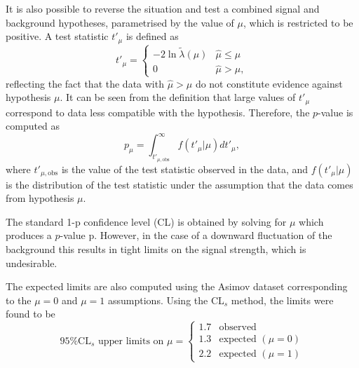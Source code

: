 It is also possible to reverse the situation and test a combined signal
and background hypotheses, parametrised by the value of $\mu$, which is
restricted to be positive. A test statistic $t'_\mu$ is defined as
\begin{equation}
t'_\mu =
    \begin{cases}
     -2\ln{\tilde\lambda(\mu)} & \hat\mu \leq \mu \\
     0                         & \hat\mu > \mu,
    \end{cases}
\end{equation}
reflecting the fact that the data with $\hat\mu > \mu$ do not constitute
evidence against hypothesis $\mu$. It can be seen from the definition
that large values of $t'_\mu$ correspond to data less compatible with the
hypothesis. Therefore, the $p$-value is computed as
\begin{equation}
p_\mu = \int_{t'_{\mu, \text{obs}}}^{\infty} f(t'_\mu | \mu) d t'_\mu,
\end{equation}
where $t'_{\mu, \text{obs}}$ is the value of the test statistic observed
in the data, and $f(t'_\mu | \mu)$ is the distribution of the test statistic
under the assumption that the data comes from hypothesis $\mu$.

The standard 1-p confidence level (CL) is obtained by solving for $\mu$
which produces a $p$-value p. However, in the case of a downward fluctuation
of the background this results in tight limits on the signal strength,
which is undesirable. 

The expected limits are also computed using the Asimov dataset
corresponding to the $\mu=0$ and $\mu=1$ assumptions. Using the CL$_s$
method, the limits were found to be
\begin{equation}
\text{95\% CL$_s$ upper limits on $\mu$} =
    \begin{cases}
     1.7 & \text{observed } \\
     1.3 & \text{expected } (\mu = 0) \\
     2.2 & \text{expected } (\mu = 1)
    \end{cases}
\end{equation}


